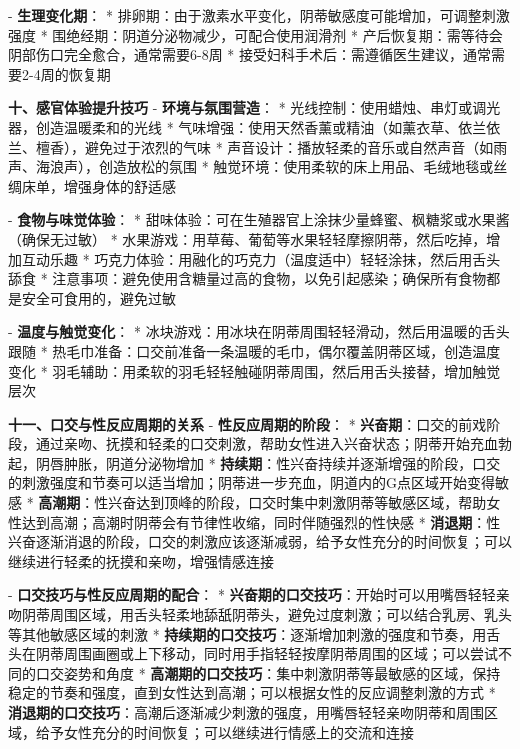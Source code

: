 \begin{enumerate}
  - \textbf{生理变化期}：
    * 排卵期：由于激素水平变化，阴蒂敏感度可能增加，可调整刺激强度
    * 围绝经期：阴道分泌物减少，可配合使用润滑剂
    * 产后恢复期：需等待会阴部伤口完全愈合，通常需要6-8周
    * 接受妇科手术后：需遵循医生建议，通常需要2-4周的恢复期

  \textbf{十、感官体验提升技巧}
  - \textbf{环境与氛围营造}：
    * 光线控制：使用蜡烛、串灯或调光器，创造温暖柔和的光线
    * 气味增强：使用天然香薰或精油（如薰衣草、依兰依兰、檀香），避免过于浓烈的气味
    * 声音设计：播放轻柔的音乐或自然声音（如雨声、海浪声），创造放松的氛围
    * 触觉环境：使用柔软的床上用品、毛绒地毯或丝绸床单，增强身体的舒适感

  - \textbf{食物与味觉体验}：
    * 甜味体验：可在生殖器官上涂抹少量蜂蜜、枫糖浆或水果酱（确保无过敏）
    * 水果游戏：用草莓、葡萄等水果轻轻摩擦阴蒂，然后吃掉，增加互动乐趣
    * 巧克力体验：用融化的巧克力（温度适中）轻轻涂抹，然后用舌头舔食
    * 注意事项：避免使用含糖量过高的食物，以免引起感染；确保所有食物都是安全可食用的，避免过敏

  - \textbf{温度与触觉变化}：
    * 冰块游戏：用冰块在阴蒂周围轻轻滑动，然后用温暖的舌头跟随
    * 热毛巾准备：口交前准备一条温暖的毛巾，偶尔覆盖阴蒂区域，创造温度变化
    * 羽毛辅助：用柔软的羽毛轻轻触碰阴蒂周围，然后用舌头接替，增加触觉层次

  \textbf{十一、口交与性反应周期的关系}
  - \textbf{性反应周期的阶段}：
    * \textbf{兴奋期}：口交的前戏阶段，通过亲吻、抚摸和轻柔的口交刺激，帮助女性进入兴奋状态；阴蒂开始充血勃起，阴唇肿胀，阴道分泌物增加
    * \textbf{持续期}：性兴奋持续并逐渐增强的阶段，口交的刺激强度和节奏可以适当增加；阴蒂进一步充血，阴道内的G点区域开始变得敏感
    * \textbf{高潮期}：性兴奋达到顶峰的阶段，口交时集中刺激阴蒂等敏感区域，帮助女性达到高潮；高潮时阴蒂会有节律性收缩，同时伴随强烈的性快感
    * \textbf{消退期}：性兴奋逐渐消退的阶段，口交的刺激应该逐渐减弱，给予女性充分的时间恢复；可以继续进行轻柔的抚摸和亲吻，增强情感连接

  - \textbf{口交技巧与性反应周期的配合}：
    * \textbf{兴奋期的口交技巧}：开始时可以用嘴唇轻轻亲吻阴蒂周围区域，用舌头轻柔地舔舐阴蒂头，避免过度刺激；可以结合乳房、乳头等其他敏感区域的刺激
    * \textbf{持续期的口交技巧}：逐渐增加刺激的强度和节奏，用舌头在阴蒂周围画圈或上下移动，同时用手指轻轻按摩阴蒂周围的区域；可以尝试不同的口交姿势和角度
    * \textbf{高潮期的口交技巧}：集中刺激阴蒂等最敏感的区域，保持稳定的节奏和强度，直到女性达到高潮；可以根据女性的反应调整刺激的方式
    * \textbf{消退期的口交技巧}：高潮后逐渐减少刺激的强度，用嘴唇轻轻亲吻阴蒂和周围区域，给予女性充分的时间恢复；可以继续进行情感上的交流和连接


\end{enumerate}
